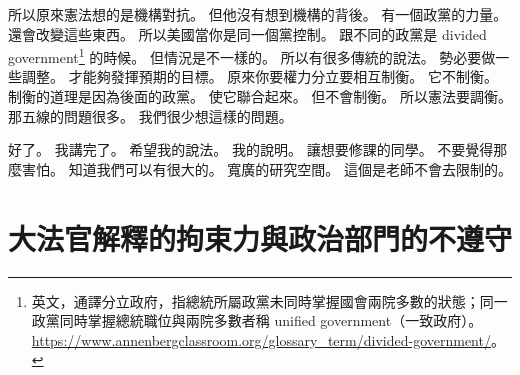 \hypertarget{w01:cue:1876}{}所以原來憲法想的是機構對抗。
\hypertarget{w01:cue:1877}{}但他沒有想到機構的背後。
\hypertarget{w01:cue:1878}{}有一個政黨的力量。
\hypertarget{w01:cue:1879}{}還會改變這些東西。
\hypertarget{w01:cue:1880}{}所以美國當你是同一個黨控制。
\hypertarget{w01:cue:1881}{}跟不同的政黨是 divided government\footnote{英文，通譯分立政府，指總統所屬政黨未同時掌握國會兩院多數的狀態；同一政黨同時掌握總統職位與兩院多數者稱 unified government（一致政府）。\url{https://www.annenbergclassroom.org/glossary_term/divided-government/}。} 的時候。
\hypertarget{w01:cue:1882}{}但情況是不一樣的。
\hypertarget{w01:cue:1883}{}所以有很多傳統的說法。
\hypertarget{w01:cue:1884}{}勢必要做一些調整。
\hypertarget{w01:cue:1885}{}才能夠發揮預期的目標。
\hypertarget{w01:cue:1886}{}原來你要權力分立要相互制衡。
\hypertarget{w01:cue:1887}{}它不制衡。
\hypertarget{w01:cue:1888}{}制衡的道理是因為後面的政黨。
\hypertarget{w01:cue:1889}{}使它聯合起來。
\hypertarget{w01:cue:1890}{}但不會制衡。
\hypertarget{w01:cue:1891}{}所以憲法要調衡。
\hypertarget{w01:cue:1892}{}那五線的問題很多。
\hypertarget{w01:cue:1893}{}我們很少想這樣的問題。

\hypertarget{w01:cue:1894}{}好了。
\hypertarget{w01:cue:1895}{}我講完了。
\hypertarget{w01:cue:1896}{}希望我的說法。
\hypertarget{w01:cue:1897}{}我的說明。
\hypertarget{w01:cue:1898}{}讓想要修課的同學。
\hypertarget{w01:cue:1899}{}不要覺得那麼害怕。
\hypertarget{w01:cue:1900}{}知道我們可以有很大的。
\hypertarget{w01:cue:1901}{}寬廣的研究空間。
\hypertarget{w01:cue:1902}{}這個是老師不會去限制的。

\section{大法官解釋的拘束力與政治部門的不遵守}

